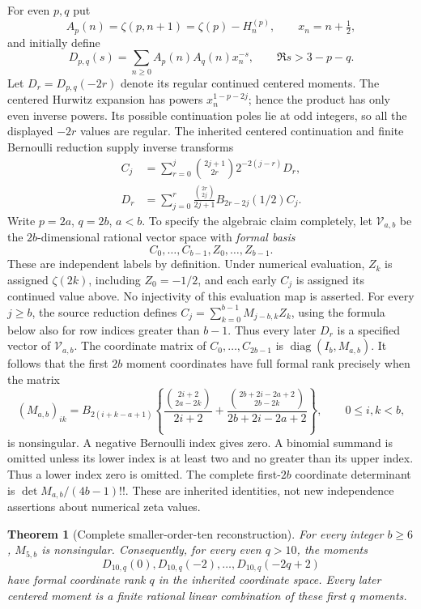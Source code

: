 \documentclass[11pt,letterpaper]{article}
\numberwithin{equation}{section}
\newtheorem{theorem}{Theorem}[section]
\theoremstyle{definition}
\theoremstyle{remark}
\begin{document}
For even $p,q$ put
\[
 A_p(n)=\zeta(p,n+1)=\zeta(p)-H_n^{(p)},\qquad x_n=n+\tfrac12,
\]
and initially define
\[
 D_{p,q}(s)=\sum_{n\ge0}A_p(n)A_q(n)x_n^{-s},
 \qquad \Re s>3-p-q.
\]
Let $D_r=D_{p,q}(-2r)$ denote its regular continued centered moments.
The centered Hurwitz expansion has powers $x_n^{1-p-2j}$; hence
the product has only even inverse powers. Its possible continuation
poles lie at odd integers, so all the displayed $-2r$ values are regular.
The inherited centered continuation and finite Bernoulli reduction
supply inverse transforms
\begin{align}
 C_j&=\sum_{r=0}^j\binom{2j+1}{2r}2^{-2(j-r)}D_r,
 \label{t10:inverse}\\
 D_r&=\sum_{j=0}^r\frac{\binom{2r}{2j}}{2j+1}
 B_{2r-2j}(1/2)C_j.\label{t10:forward}
\end{align}
Write $p=2a$, $q=2b$, $a<b$. To specify the algebraic claim completely,
let $\mathcal V_{a,b}$ be the $2b$-dimensional rational vector space with
\emph{formal basis}
\[
 C_0,\ldots,C_{b-1},Z_0,\ldots,Z_{b-1}.
\]
These are independent labels by definition. Under numerical evaluation,
$Z_k$ is assigned $\zeta(2k)$, including $Z_0=-1/2$, and each early
$C_j$ is assigned its continued value above. No injectivity of this
evaluation map is asserted. For every $j\ge b$, the source reduction
defines $C_j=\sum_{k=0}^{b-1}M_{j-b,k}Z_k$, using the formula below
also for row indices greater than $b-1$. Thus every later $D_r$ is a
specified vector of $\mathcal V_{a,b}$. The coordinate matrix of
$C_0,\ldots,C_{2b-1}$ is $\operatorname{diag}(I_b,M_{a,b})$.
It follows that the first $2b$ moment coordinates have full formal
rank precisely when the matrix
\begin{equation}\label{t10:M}
 (M_{a,b})_{ik}=B_{2(i+k-a+1)}
 \left\{\frac{\binom{2i+2}{2a-2k}}{2i+2}
 +\frac{\binom{2b+2i-2a+2}{2b-2k}}{2b+2i-2a+2}\right\},
 \qquad0\le i,k<b,
\end{equation}
is nonsingular. A negative Bernoulli index gives zero. A binomial
summand is omitted unless its lower index is at least two and no
greater than its upper index. Thus a lower index zero is omitted.
The complete first-$2b$ coordinate determinant is
$\det M_{a,b}/(4b-1)!!$. These are inherited identities, not new
independence assertions about numerical zeta values.

\begin{theorem}[Complete smaller-order-ten reconstruction]
\label{t10:complete}
For every integer $b\ge6$, $M_{5,b}$ is nonsingular. Consequently,
for every even $q>10$, the moments
\[
 D_{10,q}(0),D_{10,q}(-2),\ldots,D_{10,q}(-2q+2)
\]
have formal coordinate rank $q$ in the inherited coordinate space.
Every later centered moment is a finite rational linear combination
of these first $q$ moments.
\end{theorem}
\end{document}

